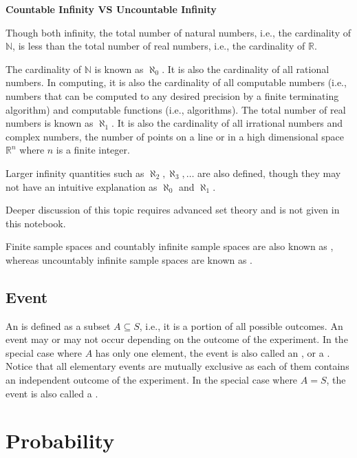\begin{mdframed}
\noindent \textbf{Countable Infinity VS Uncountable Infinity}

Though both infinity, the total number of natural numbers, i.e., the cardinality of $\mathbb{N}$, is less than the total number of real numbers, i.e., the cardinality of $\mathbb{R}$.

The cardinality of $\mathbb{N}$ is known as $\aleph_0$. It is also the cardinality of all rational numbers. In computing, it is also the cardinality of all computable numbers (i.e., numbers that can be computed to any desired precision by a finite terminating algorithm) and computable functions (i.e., algorithms). The total number of real numbers is known as $\aleph_1$. It is also the cardinality of all irrational numbers and complex numbers, the number of points on a line or in a high dimensional space $\mathbb{R}^n$ where $n$ is a finite integer.

Larger infinity quantities such as $\aleph_2, \aleph_3, \ldots$ are also defined, though they may not have an intuitive explanation as $\aleph_0$ and $\aleph_1$.

Deeper discussion of this topic requires advanced set theory and is not given in this notebook.
\end{mdframed}

Finite sample spaces and countably infinite sample spaces are also known as , whereas uncountably infinite sample spaces are known as .

\subsection{Event}

An  is defined as a subset $A \subseteq S$, i.e., it is a portion of all possible outcomes. An event may or may not occur depending on the outcome of the experiment. In the special case where $A$ has only one element, the event is also called an , or a . Notice that all elementary events are mutually exclusive as each of them contains an independent outcome of the experiment. In the special case where $A=S$, the event is also called a .

\section{Probability}

